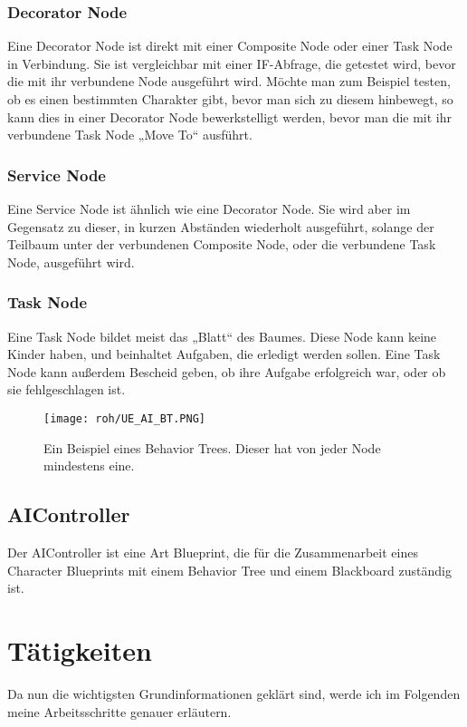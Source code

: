 \subsubsection{Decorator Node}
Eine Decorator Node ist direkt mit einer Composite Node oder einer Task Node in Verbindung.
Sie ist vergleichbar mit einer IF-Abfrage, die getestet wird, bevor die mit ihr verbundene Node ausgeführt wird.
Möchte man zum Beispiel testen, ob es einen bestimmten Charakter gibt, bevor man sich zu diesem hinbewegt, so kann dies in einer Decorator Node bewerkstelligt werden, bevor man die mit ihr verbundene Task Node „Move To“ ausführt.
\subsubsection{Service Node}
Eine Service Node ist ähnlich wie eine Decorator Node.
Sie wird aber im Gegensatz zu dieser, in kurzen Abständen wiederholt ausgeführt, solange der Teilbaum unter der verbundenen Composite Node, oder die verbundene Task Node, ausgeführt wird.
\subsubsection{Task Node}
Eine Task Node bildet meist das „Blatt“ des Baumes.
Diese Node kann keine Kinder haben, und beinhaltet Aufgaben, die erledigt werden sollen. Eine Task Node kann außerdem Bescheid geben, ob ihre Aufgabe erfolgreich war, oder ob sie fehlgeschlagen ist.
\begin{figure}[H]
    \centering
    \texttt{[image: roh/UE\_AI\_BT.PNG]}
    \caption{Ein Beispiel eines Behavior Trees. Dieser hat von jeder Node mindestens eine.}
    \label{UE:AI_BT}
\end{figure}
\subsection{AIController} \citep{ue:AIAIController}
Der AIController ist eine Art Blueprint, die für die Zusammenarbeit eines Character Blueprints mit einem Behavior Tree und einem Blackboard zuständig ist.

\section{Tätigkeiten}
Da nun die wichtigsten Grundinformationen geklärt sind, werde ich im Folgenden meine Arbeitsschritte genauer erläutern.
